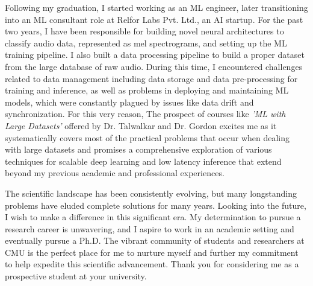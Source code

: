\documentclass{article}
\begin{document}
Following my graduation, I started working as an ML engineer, later
transitioning into an ML consultant role at Relfor Labs Pvt. Ltd., an AI
startup. For the past two years, I have been responsible for building novel
neural architectures to classify audio data, represented as mel spectrograms,
and setting up the ML training pipeline. I also built a data processing pipeline
to build a proper dataset from the large database of raw audio. During this
time, I encountered challenges related to data management including data storage
and data pre-processing for training and inference, as well as problems in
deploying and maintaining ML models, which were constantly plagued by issues
like data drift and synchronization. For this very reason, The prospect of
courses like \textit{'ML with Large Datasets'} offered by Dr. Talwalkar and Dr. Gordon
excites me as it systematically covers most of the practical problems that occur
when dealing with large datasets and promises a comprehensive exploration of
various techniques for scalable deep learning and low latency inference that
extend beyond my previous academic and professional experiences.

The scientific landscape has been consistently evolving, but many longstanding
problems have eluded complete solutions for many years. Looking into the future,
I wish to make a difference in this significant era. My determination to pursue
a research career is unwavering, and I aspire to work in an academic setting and
eventually pursue a Ph.D. The vibrant community of students and researchers at
CMU is the perfect place for me to nurture myself and further my commitment to
help expedite this scientific advancement. Thank you for considering me as a
prospective student at your university.
\end{document}
